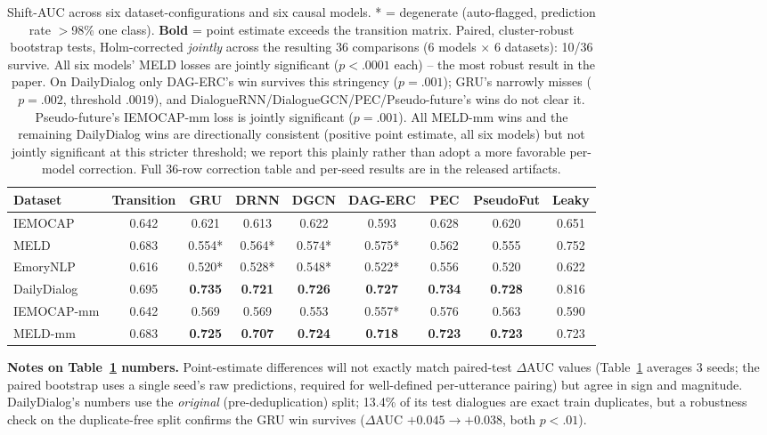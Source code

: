 \documentclass[conference]{IEEEtran}
\begin{document}
\begin{table}[t]
\centering
\footnotesize
\caption{Shift-AUC across six dataset-configurations and six causal models. * = degenerate
(auto-flagged, prediction rate $>$98\% one class). \textbf{Bold} = point estimate exceeds the
transition matrix. Paired, cluster-robust bootstrap tests, Holm-corrected \emph{jointly} across
the resulting 36 comparisons (6 models $\times$ 6 datasets): 10/36 survive. All six models' MELD
losses are jointly significant ($p<.0001$ each) -- the most robust result in the paper. On
DailyDialog only DAG-ERC's win survives this stringency ($p{=}.001$); GRU's narrowly misses
($p{=}.002$, threshold $.0019$), and DialogueRNN/DialogueGCN/PEC/Pseudo-future's wins do not clear
it. Pseudo-future's IEMOCAP-mm loss is jointly significant ($p{=}.001$). All MELD-mm wins and the
remaining DailyDialog wins are directionally consistent (positive point estimate, all six models)
but not jointly significant at this stricter threshold; we report this plainly rather than adopt a
more favorable per-model correction. Full 36-row correction table and per-seed results are in the
released artifacts.}
\label{tab:main}
\begin{tabular}{lcccccccc}\toprule
Dataset & Transition & GRU & DRNN & DGCN & DAG-ERC & PEC & PseudoFut & Leaky \\
\midrule
IEMOCAP      & 0.642 & 0.621  & 0.613  & 0.622  & 0.593  & 0.628 & 0.620 & 0.651 \\
MELD         & 0.683 & 0.554* & 0.564* & 0.574* & 0.575* & 0.562 & 0.555 & 0.752 \\
EmoryNLP     & 0.616 & 0.520* & 0.528* & 0.548* & 0.522* & 0.556 & 0.520 & 0.622 \\
DailyDialog  & 0.695 & \textbf{0.735} & \textbf{0.721} & \textbf{0.726} & \textbf{0.727} & \textbf{0.734} & \textbf{0.728} & 0.816 \\
IEMOCAP-mm   & 0.642 & 0.569  & 0.569  & 0.553  & 0.557* & 0.576 & 0.563 & 0.590 \\
MELD-mm      & 0.683 & \textbf{0.725} & \textbf{0.707} & \textbf{0.724} & \textbf{0.718} & \textbf{0.723} & \textbf{0.723} & 0.723 \\
\bottomrule
\end{tabular}
\end{table}

\textbf{Notes on Table~\ref{tab:main} numbers.} Point-estimate differences will not exactly match
paired-test $\Delta$AUC values (Table~\ref{tab:main} averages 3 seeds; the paired bootstrap uses a
single seed's raw predictions, required for well-defined per-utterance pairing) but agree in sign
and magnitude. DailyDialog's numbers use the \emph{original} (pre-deduplication) split; 13.4\% of
its test dialogues are exact train duplicates, but a robustness check on the duplicate-free split
confirms the GRU win survives ($\Delta$AUC $+0.045{\to}+0.038$, both $p<.01$).
\end{document}
